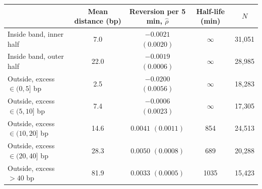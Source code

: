 \begin{tabular}{lcccc}
\toprule
 & Mean distance (bp) & Reversion per 5 min, $\hat\rho$ & Half-life (min) & $N$ \\
\midrule
Inside band, inner half & 7.0 & $-0.0021$ $(0.0020)$ & $\infty$ & 31,051 \\
Inside band, outer half & 22.0 & $-0.0019$ $(0.0006)$ & $\infty$ & 28,985 \\
Outside, excess $\in(0,5]$ bp & 2.5 & $-0.0200$ $(0.0056)$ & $\infty$ & 18,283 \\
Outside, excess $\in(5,10]$ bp & 7.4 & $-0.0006$ $(0.0023)$ & $\infty$ & 17,305 \\
Outside, excess $\in(10,20]$ bp & 14.6 & $0.0041$ $(0.0011)$ & 854 & 24,513 \\
Outside, excess $\in(20,40]$ bp & 28.3 & $0.0050$ $(0.0008)$ & 689 & 20,288 \\
Outside, excess $>40$ bp & 81.9 & $0.0033$ $(0.0005)$ & 1035 & 15,423 \\
\bottomrule
\end{tabular}
